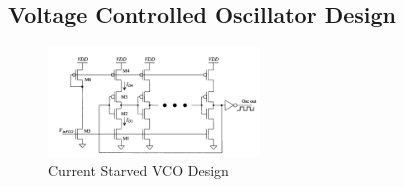 \subsection{Voltage Controlled Oscillator Design}

\begin{figure}[h]
	\centering
	\includegraphics[width=0.5\textwidth]{figs/cs_vco_design.png}
	\caption{Current Starved VCO Design}
	\label{fig:cs_vco_design}
	
\end{figure}


